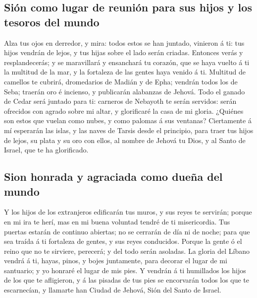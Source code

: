 \hypertarget{siuxf3n-como-lugar-de-reuniuxf3n-para-sus-hijos-y-los-tesoros-del-mundo}{%
\subsection{Sión como lugar de reunión para sus hijos y los tesoros del
mundo}\label{siuxf3n-como-lugar-de-reuniuxf3n-para-sus-hijos-y-los-tesoros-del-mundo}}

 Alza tus ojos en derredor, y mira: todos estos se han
juntado, vinieron á ti: tus hijos vendrán de lejos, y tus hijas sobre el
lado serán criadas.  Entonces verás y resplandecerás; y se
maravillará y ensanchará tu corazón, que se haya vuelto á ti la multitud
de la mar, y la fortaleza de las gentes haya venido á ti. 
Multitud de camellos te cubrirá, dromedarios de Madián y de Epha;
vendrán todos los de Seba; traerán oro é incienso, y publicarán
alabanzas de Jehová.  Todo el ganado de Cedar será juntado
para ti: carneros de Nebayoth te serán servidos: serán ofrecidos con
agrado sobre mi altar, y glorificaré la casa de mi gloria.
 ¿Quiénes son estos que vuelan como nubes, y como palomas
á sus ventanas?  Ciertamente á mí esperarán las islas, y
las naves de Tarsis desde el principio, para traer tus hijos de lejos,
su plata y su oro con ellos, al nombre de Jehová tu Dios, y al Santo de
Israel, que te ha glorificado.

\hypertarget{sion-honrada-y-agraciada-como-dueuxf1a-del-mundo}{%
\subsection{Sion honrada y agraciada como dueña del
mundo}\label{sion-honrada-y-agraciada-como-dueuxf1a-del-mundo}}

 Y los hijos de los extranjeros edificarán tus muros, y
sus reyes te servirán; porque en mi ira te herí, mas en mi buena
voluntad tendré de ti misericordia.  Tus puertas estarán
de continuo abiertas; no se cerrarán de día ni de noche; para que sea
traída á ti fortaleza de gentes, y sus reyes conducidos. 
Porque la gente ó el reino que no te sirviere, perecerá; y del todo
serán asoladas.  La gloria del Líbano vendrá á ti, hayas,
pinos, y bojes juntamente, para decorar el lugar de mi santuario; y yo
honraré el lugar de mis pies.  Y vendrán á ti humillados
los hijos de los que te afligieron, y á las pisadas de tus pies se
encorvarán todos los que te escarnecían, y llamarte han Ciudad de
Jehová, Sión del Santo de Israel.

